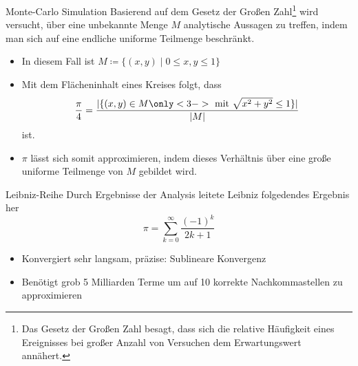 \documentclass{beamer}
\begin{document}
\begin{frame}{Monte-Carlo Simulation}
    Basierend auf dem Gesetz der Großen Zahl\footnote{Das Gesetz der Großen Zahl
        besagt, dass sich die relative Häufigkeit eines Ereignisses bei großer Anzahl
        von Versuchen dem Erwartungswert annähert.
    } wird versucht, über eine unbekannte Menge \(M\) analytische Aussagen zu treffen,
    indem man sich auf eine endliche uniforme Teilmenge beschränkt.
    \begin{itemize}
        \item<1-> In diesem Fall ist \(M \coloneq \{(x, y) \mid 0 \le x,y \le 1\}\)
        \item<2-> Mit dem Flächeninhalt eines Kreises folgt, dass
              \begin{equation*}
                  \frac{\pi}{4} = \frac{
                      |\{(x,y) \in M \only<3->{\text{\ mit } \sqrt{x^2 + y^2} \le 1} \}|
                  }{|M|}
              \end{equation*}
              ist.
        \item<4-> \(\pi\) lässt sich somit approximieren, indem dieses Verhältnis über eine große uniforme Teilmenge von \(M\) gebildet wird.
    \end{itemize}
\end{frame}

\begin{frame}{Leibniz-Reihe}
    Durch Ergebnisse der Analysis leitete Leibniz folgedendes Ergebnis her \cite{Leibniz}
    \[ \pi = \sum_{k=0}^{\infty} \frac{(-1)^k}{2k+1} \]
    \begin{itemize}
        \item<3-> Konvergiert sehr langsam, präzise: Sublineare Konvergenz \\
        \item<3-> Benötigt grob 5 Milliarden Terme um auf 10 korrekte Nachkommastellen zu approximieren
    \end{itemize}
\end{frame}
\end{document}
